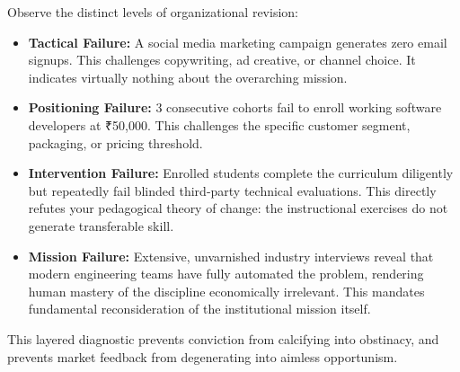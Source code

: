 Observe the distinct levels of organizational revision:

\begin{itemize}[leftmargin=11pt,itemsep=2pt,topsep=1.5pt,parsep=0pt]
  \item \textbf{Tactical Failure:} A social media marketing campaign generates zero email signups. This challenges copywriting, ad creative, or channel choice. It indicates virtually nothing about the overarching mission.
  \item \textbf{Positioning Failure:} 3 consecutive cohorts fail to enroll working software developers at ₹50,000. This challenges the specific customer segment, packaging, or pricing threshold.
  \item \textbf{Intervention Failure:} Enrolled students complete the curriculum diligently but repeatedly fail blinded third-party technical evaluations. This directly refutes your pedagogical theory of change: the instructional exercises do not generate transferable skill.
  \item \textbf{Mission Failure:} Extensive, unvarnished industry interviews reveal that modern engineering teams have fully automated the problem, rendering human mastery of the discipline economically irrelevant. This mandates fundamental reconsideration of the institutional mission itself.
\end{itemize}

This layered diagnostic prevents conviction from calcifying into obstinacy, and prevents market feedback from degenerating into aimless opportunism.
